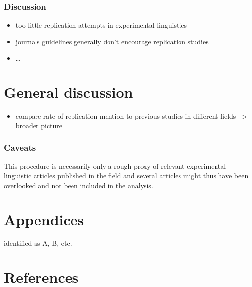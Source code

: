 \documentclass[]{elsarticle} %
\providecommand{\tightlist}{%
  \setlength{\itemsep}{0pt}\setlength{\parskip}{0pt}}
\begin{document}
\hypertarget{discussion}{%
\subsubsection{Discussion}\label{discussion}}

\begin{itemize}
\tightlist
\item
  too little replication attempts in experimental linguistics
\item
  journals guidelines generally don't encourage replication studies
\item
  \ldots{}
\end{itemize}

\hypertarget{general-discussion}{%
\section{General discussion}\label{general-discussion}}

\begin{itemize}
\tightlist
\item
  compare rate of replication mention to previous studies in different
  fields --\textgreater{} broader picture
\end{itemize}

\hypertarget{caveats}{%
\subsubsection{Caveats}\label{caveats}}

This procedure is necessarily only a rough proxy of relevant
experimental linguistic articles published in the field and several
articles might thus have been overlooked and not been included in the
analysis.

\hypertarget{appendices}{%
\section{Appendices}\label{appendices}}

identified as A, B, etc.

\hypertarget{references}{%
\section*{References}\label{references}}
\end{document}
